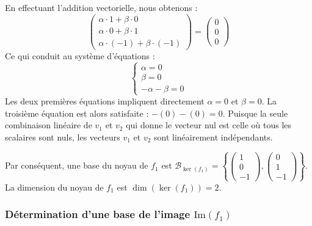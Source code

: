 \documentclass{report}
\begin{document}
En effectuant l'addition vectorielle, nous obtenons :
$$ \begin{pmatrix} \alpha \cdot 1 + \beta \cdot 0 \\ \alpha \cdot 0 + \beta \cdot 1 \\ \alpha \cdot (-1) + \beta \cdot (-1) \end{pmatrix} = \begin{pmatrix} 0 \\ 0 \\ 0 \end{pmatrix} $$
Ce qui conduit au système d'équations :
$$ \begin{cases} \alpha = 0 \\ \beta = 0 \\ -\alpha - \beta = 0 \end{cases} $$
Les deux premières équations impliquent directement $\alpha = 0$ et $\beta = 0$. La troisième équation est alors satisfaite : $-(0) - (0) = 0$.
Puisque la seule combinaison linéaire de $v_1$ et $v_2$ qui donne le vecteur nul est celle où tous les scalaires sont nuls, les vecteurs $v_1$ et $v_2$ sont linéairement indépendants.

Par conséquent, une base du noyau de $f_1$ est $\mathcal{B}_{\ker(f_1)} = \left\{ \begin{pmatrix} 1 \\ 0 \\ -1 \end{pmatrix}, \begin{pmatrix} 0 \\ 1 \\ -1 \end{pmatrix} \right\}$.
La dimension du noyau de $f_1$ est $\dim(\ker(f_1)) = 2$.

\subsubsection*{Détermination d'une base de l'image $\text{Im}(f_1)$}
\end{document}
